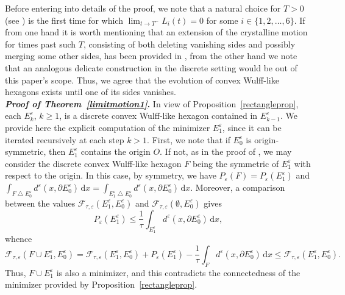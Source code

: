 \documentclass{interact}
\numberwithin{equation}{section}
\theoremstyle{definition}
\renewcommand{\epsilon}{\varepsilon}
\def\e{\epsilon}
\begin{document}
Before entering into details of the proof, we note that a natural choice for $T>0$ (see \cite[Theorem~3]{BGN}) is the first time for which $\lim_{t\to T^-}L_i(t)=0$ for some $i\in\{1,2,\dots,6\}$. If from one hand it is worth mentioning that an extension of the crystalline motion for times past such $T$, consisting of both deleting vanishing sides and possibly merging some other sides, has been provided in \cite[Section~2.3]{Ta}, from the other hand we note that an analogous delicate construction in the discrete setting would be out of this paper's scope. Thus, we agree that the evolution of convex Wulff-like hexagons exists until one of its sides vanishes.\\

\noindent
{\bf\emph {Proof of Theorem~\ref{limitmotion1}}.} 
{In view of Proposition~\ref{rectangleprop}, each $E^\epsilon_k$, $k\geq1$, is a discrete convex Wulff-like hexagon contained in $E^\epsilon_{k-1}$. We provide here the explicit computation of the minimizer $E^\epsilon_1$, since it can be iterated recursively at each step $k>1$.}  First, we note that if $E^\epsilon_0$ is origin-symmetric, then $E^\epsilon_1$ contains the origin $O$. If not, as in the proof of \cite[Theorem~1]{BGN}, we may consider the discrete convex Wulff-like hexagon $F$ being the symmetric of $E^\epsilon_1$ with respect to the origin. In this case, by symmetry, we have $P_\epsilon(F)=P_\epsilon(E^\epsilon_1)$ and $\int_{F\bigtriangleup E_0^\e}d^\epsilon(x,\partial E_0^\e)\,\mathrm{d}x=\int_{E^\epsilon_1\bigtriangleup E_0^\e}d^\epsilon(x,\partial E_0^\e)\,\mathrm{d}x$. Moreover, a comparison between the values $\mathcal{F}_{\tau,\epsilon}(E_1^\epsilon,E_{0}^\epsilon)$ and $\mathcal{F}_{\tau,\epsilon}(\emptyset,E_{0}^\epsilon)$ gives
\begin{equation*}
P_\epsilon(E^\epsilon_1)\leq\frac{1}{\tau}\int_{E^\epsilon_1}d^\epsilon(x,\partial E_0^\e)\,\mathrm{d}x,
\end{equation*}
whence
\begin{equation*}
\mathcal{F}_{\tau,\epsilon}(F\cup E_1^\epsilon,E_{0}^\epsilon)=\mathcal{F}_{\tau,\epsilon}(E_1^\epsilon,E_{0}^\epsilon)+P_\epsilon(E_1^\epsilon)-\frac{1}{\tau}\int_{F}d^\epsilon(x,\partial E_0^\e)\,\mathrm{d}x\leq \mathcal{F}_{\tau,\epsilon}(E_1^\epsilon,E_{0}^\epsilon).
\end{equation*}
Thus, $F\cup E_1^\epsilon$ is also a minimizer, and this contradicts the connectedness of the minimizer provided by Proposition~\ref{rectangleprop}.
\end{document}
